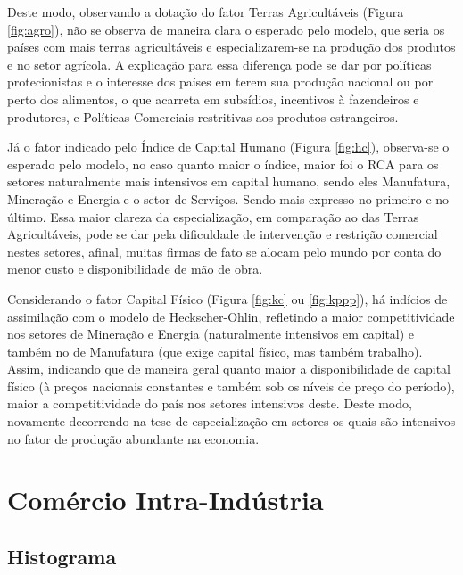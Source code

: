 Deste modo, observando a dotação do fator Terras Agricultáveis (Figura \ref{fig:agro}), não se observa de maneira clara o esperado pelo modelo, que seria os países com mais terras agricultáveis e especializarem-se na produção dos produtos e no setor agrícola. A explicação para essa diferença pode se dar por políticas protecionistas e o interesse dos países em terem sua produção nacional ou por perto dos alimentos, o que acarreta em subsídios, incentivos à fazendeiros e produtores, e Políticas Comerciais restritivas aos produtos estrangeiros.

Já o fator indicado pelo Índice de Capital Humano (Figura \ref{fig:hc}), observa-se o esperado pelo modelo, no caso quanto maior o índice, maior foi o RCA para os setores naturalmente mais intensivos em capital humano, sendo eles Manufatura, Mineração e Energia e o setor de Serviços. Sendo mais expresso no primeiro e no último. Essa maior clareza da especialização, em comparação ao das Terras Agricultáveis, pode se dar pela dificuldade de intervenção e restrição comercial nestes setores, afinal, muitas firmas de fato se alocam pelo mundo por conta do menor custo e disponibilidade de mão de obra.

Considerando o fator Capital Físico (Figura \ref{fig:kc} ou \ref{fig:kppp}), há indícios de assimilação com o modelo de Heckscher-Ohlin, refletindo a maior competitividade nos setores de Mineração e Energia (naturalmente intensivos em capital) e também no de Manufatura (que exige capital físico, mas também trabalho). Assim, indicando que de maneira geral quanto maior a disponibilidade de capital físico (à preços nacionais constantes e também sob os níveis de preço do período), maior a competitividade do país nos setores intensivos deste. Deste modo, novamente decorrendo na tese de especialização em setores os quais são intensivos no fator de produção abundante na economia.

\clearpage
\section{Comércio Intra-Indústria}
\setcounter{subsection}{5}

\subsection{Histograma}

